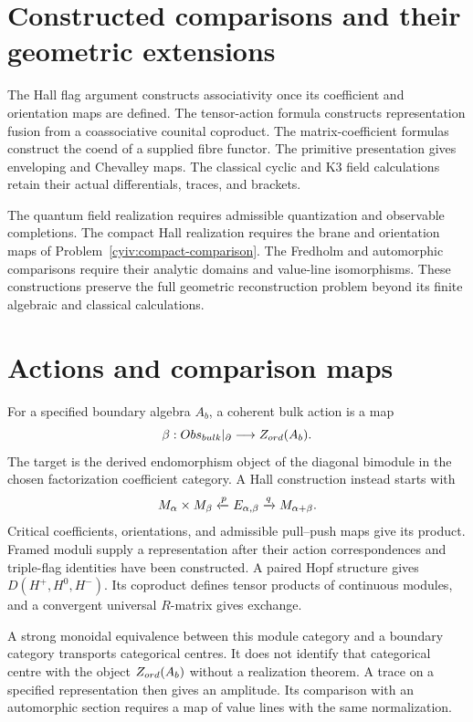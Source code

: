 \section{Constructed comparisons and their geometric extensions}
The Hall flag argument constructs associativity once its coefficient
and orientation maps are defined.
The tensor-action formula constructs representation fusion from a
coassociative counital coproduct.
The matrix-coefficient formulas construct the coend of a supplied
fibre functor.
The primitive presentation gives enveloping and Chevalley maps.
The classical cyclic and K3 field calculations retain their actual
differentials, traces, and brackets.

The quantum field realization requires admissible quantization and
observable completions.
The compact Hall realization requires the brane and orientation maps
of Problem~\ref{cyiv:compact-comparison}.
The Fredholm and automorphic comparisons require their analytic domains
and value-line isomorphisms.
These constructions preserve the full geometric reconstruction problem
beyond its finite algebraic and classical calculations.

\section{Actions and comparison maps}
For a specified boundary algebra $A_b$, a coherent bulk action is a map
\[
 \beta:Obs_{bulk}|_\partial\longrightarrow Z_{ord}(A_b).
\]
The target is the derived endomorphism object of the diagonal bimodule
in the chosen factorization coefficient category.
A Hall construction instead starts with
\[
 M_\alpha\times M_\beta\xleftarrow{p}E_{\alpha,\beta}
 \xrightarrow{q}M_{\alpha+\beta}.
\]
Critical coefficients, orientations, and admissible pull--push maps
give its product.
Framed moduli supply a representation after their action
correspondences and triple-flag identities have been constructed.
A paired Hopf structure gives $D(H^+,H^0,H^-)$.
Its coproduct defines tensor products of continuous modules, and a
convergent universal $R$-matrix gives exchange.

A strong monoidal equivalence between this module category and a
boundary category transports categorical centres.
It does not identify that categorical centre with the object
$Z_{ord}(A_b)$ without a realization theorem.
A trace on a specified representation then gives an amplitude.
Its comparison with an automorphic section requires a map of value
lines with the same normalization.


